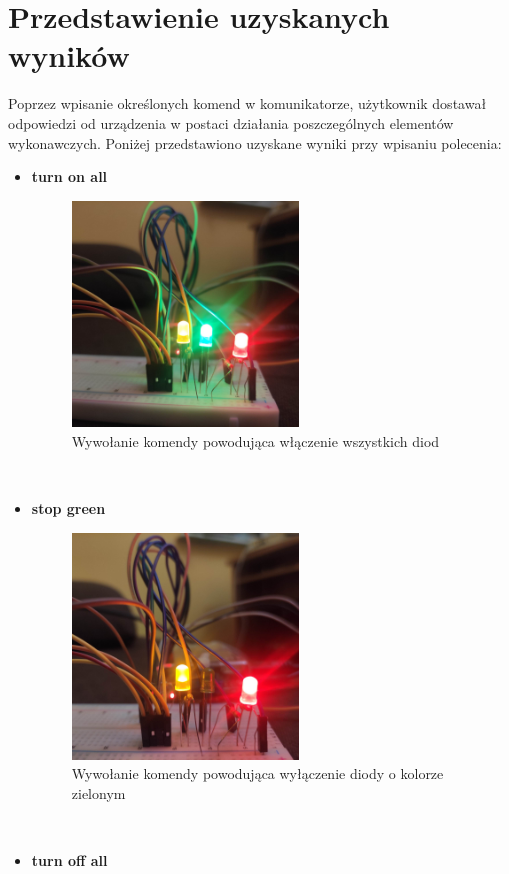 \newpage
\section{Przedstawienie uzyskanych wyników}
Poprzez wpisanie określonych komend w komunikatorze, użytkownik dostawał odpowiedzi od urządzenia w postaci działania poszczególnych elementów wykonawczych. Poniżej przedstawiono uzyskane wyniki przy wpisaniu polecenia:
\begin{itemize}  
	\item \textbf{turn on all}
	\begin{figure}[htbp]
	\centering
	\includegraphics[width=0.4\linewidth, height=6cm]{"obrazy/turnonall.jpg"}
	\caption{Wywołanie komendy powodująca włączenie wszystkich diod}
	\label{fig:51}
\end{figure}
	\\
	\item \textbf{stop green}
	\begin{figure}[htbp]
	\centering
	\includegraphics[width=0.4\linewidth, height=6cm]{"obrazy/stopgreen.jpg"}
	\caption{Wywołanie komendy powodująca wyłączenie diody o kolorze zielonym}
	\label{fig:52}
	\end{figure}
	\\
\newpage
\item \textbf{turn off all}
	\begin{figure}[htbp]

\end{figure}
\end{itemize}

